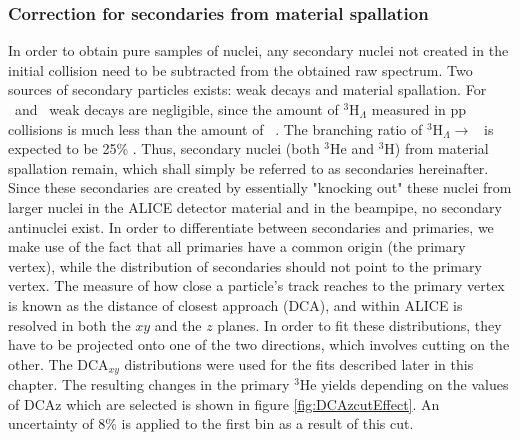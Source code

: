 

\subsubsection{Correction for secondaries from material spallation}\label{sec:Meth:secondaryCorr}
In order to obtain pure samples of nuclei, any secondary nuclei not created in the initial collision need to be subtracted from the obtained raw spectrum. Two sources of secondary particles exists: weak decays and material spallation. For \ahe\ and \atrit\, weak decays are negligible, since the amount of $^3\mathrm{H}_\Lambda$ measured in pp collisions is much less than the amount of \ahe\ . The branching ratio of $^3\mathrm{H}_\Lambda \rightarrow $ \ahe\ is expected to be 25\% \cite{PDG2022}. Thus, secondary nuclei (both $^3\mathrm{He}$ and $^3\mathrm{H}$) from material spallation remain, which shall simply be referred to as secondaries hereinafter. Since these secondaries are created by essentially "knocking out" these nuclei from larger nuclei in the ALICE detector material and in the beampipe, no secondary antinuclei exist. In order to differentiate between secondaries and primaries, we make use of the fact that all primaries have a common origin (the primary vertex), while the distribution of secondaries should not point to the primary vertex. The measure of how close a particle's track reaches to the primary vertex is known as the distance of closest approach (DCA), and within ALICE is resolved in both the $xy$ and the $z$ planes. In order to fit these distributions, they have to be projected onto one of the two directions, which involves cutting on the other. The DCA$_{xy}$ distributions were used for the fits described later in this chapter. The resulting changes in the primary $^3\mathrm{He}$ yields depending on the values of DCAz which are selected is shown in figure \ref{fig:DCAzcutEffect}. An uncertainty of 8\% is applied to the first bin as a result of this cut.

